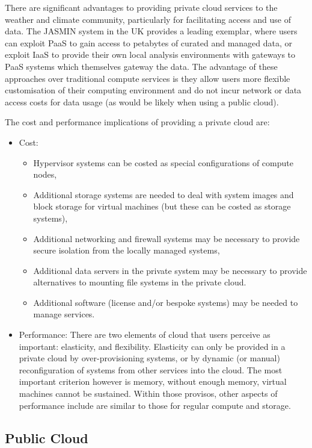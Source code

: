 \documentclass{../../template/esiwace-report}
\begin{document}
There are significant advantages to providing private cloud services to the weather and climate community, particularly for facilitating access and use of data. The JASMIN system in the UK provides a leading exemplar, where users can exploit PaaS to gain access to petabytes of curated and managed data, or exploit IaaS to provide their own local analysis environments with gateways to PaaS systems which themselves gateway the data. The advantage of these approaches over traditional compute services is they allow users more flexible customisation of their computing environment and do not incur network or data access costs for data usage (as would be likely when using a public cloud).

The cost and performance implications of providing a private cloud are:
\begin{itemize}
\item Cost:
\begin{itemize}
\item Hypervisor systems can be costed as special configurations of compute nodes,
\item Additional storage systems are needed to deal with system images and block storage for virtual machines (but these can be costed as storage systems),
\item Additional networking and firewall systems may be necessary to provide secure isolation from the locally managed systems,
\item Additional data servers in the private system may be necessary to provide alternatives to mounting file systems in the private cloud.
\item Additional software (license and/or bespoke systems) may be needed to manage services.
\end{itemize}
\item Performance: There are two elements of cloud that users perceive as important: elasticity, and flexibility. Elasticity can only be provided in a private cloud by over-provisioning systems, or by dynamic (or manual) reconfiguration of systems from other services into the cloud. The most important criterion however is memory, without enough memory, virtual machines cannot be sustained. Within those provisos, other aspects of performance include are similar to those for regular compute and storage.
\end{itemize}

\subsection {Public Cloud}
\end{document}
